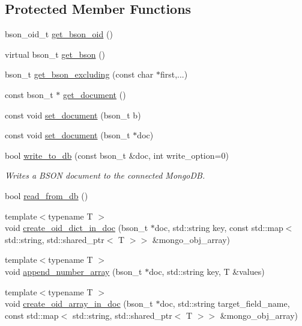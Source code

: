 \subsection*{Protected Member Functions}
\begin{DoxyCompactItemize}
\item 
bson\+\_\+oid\+\_\+t \hyperlink{class_mongo_object_aaca278b427d042a63caf2962b5e76043}{get\+\_\+bson\+\_\+oid} ()
\item 
virtual bson\+\_\+t \hyperlink{class_mongo_object_ac21cbe104a818f7e6ee7dcfbb521e9e1}{get\+\_\+bson} ()
\item 
bson\+\_\+t \hyperlink{class_mongo_object_ac35c66d91e7297eb46313b98d01751cb}{get\+\_\+bson\+\_\+excluding} (const char $\ast$first,...)
\item 
const bson\+\_\+t $\ast$ \hyperlink{class_mongo_object_a196ea1b747a08f7ab525b8851ebc0b51}{get\+\_\+document} ()
\item 
const void \hyperlink{class_mongo_object_adb597533d8e167c3d6bafd28baef349c}{set\+\_\+document} (bson\+\_\+t b)
\item 
const void \hyperlink{class_mongo_object_ae51714acc607a67518862306fac509ee}{set\+\_\+document} (bson\+\_\+t $\ast$doc)
\item 
bool \hyperlink{class_mongo_object_ab43c880a2ae99890946e7edf3d232e5a}{write\+\_\+to\+\_\+db} (const bson\+\_\+t \&doc, int write\+\_\+option=0)
\begin{DoxyCompactList}\small\item\em Writes a B\+S\+ON document to the connected Mongo\+DB. \end{DoxyCompactList}\item 
bool \hyperlink{class_mongo_object_aecd244620f292e8368d1f593925eafbd}{read\+\_\+from\+\_\+db} ()
\item 
{\footnotesize template$<$typename T $>$ }\\void \hyperlink{class_mongo_object_ae8d85ac8089beca73773bd6189a2530c}{create\+\_\+oid\+\_\+dict\+\_\+in\+\_\+doc} (bson\+\_\+t $\ast$doc, std\+::string key, const std\+::map$<$ std\+::string, std\+::shared\+\_\+ptr$<$ T $>$$>$ \&mongo\+\_\+obj\+\_\+array)
\item 
{\footnotesize template$<$typename T $>$ }\\void \hyperlink{class_mongo_object_a56dccd703ae3e3e2193d57d31df12fd0}{append\+\_\+number\+\_\+array} (bson\+\_\+t $\ast$doc, std\+::string key, T \&values)
\item 
{\footnotesize template$<$typename T $>$ }\\void \hyperlink{class_mongo_object_a0b94ea01312b792e42b944399a4eb45c}{create\+\_\+oid\+\_\+array\+\_\+in\+\_\+doc} (bson\+\_\+t $\ast$doc, std\+::string target\+\_\+field\+\_\+name, const std\+::map$<$ std\+::string, std\+::shared\+\_\+ptr$<$ T $>$$>$ \&mongo\+\_\+obj\+\_\+array)

\end{DoxyCompactItemize}
